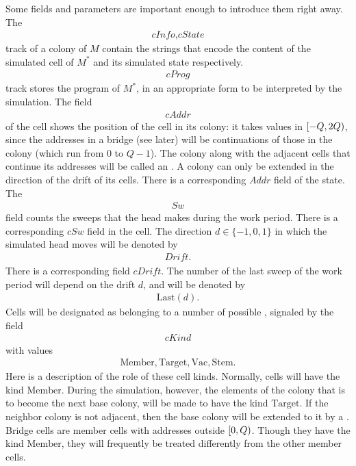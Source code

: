 \documentclass[12pt]{memoir}
\newcommand{\fld}[1]{\ensuremath{\textit{#1}}}
\newcommand{\Addr}{\fld{Addr}}
\newcommand{\cAddr}{\fld{cAddr}}
\newcommand{\Drift}{\fld{Drift}}
\newcommand{\cDrift}{\fld{cDrift}}
\newcommand{\cInfo}{\fld{cInfo}}
\newcommand{\cKind}{\fld{cKind}}
\newcommand{\cProg}{\fld{cProg}}
\newcommand{\cState}{\fld{cState}}
\newcommand{\Sweep}{\fld{Sw}}
\newcommand{\cSweep}{\fld{cSw}}
\newcommand{\Last}{\mathrm{Last}}
\newcommand{\Member}{\mathrm{Member}}
\newcommand{\Target}{\mathrm{Target}}
\newcommand{\Stem}{\mathrm{Stem}}
\newcommand{\Vacant}{\mathrm{Vac}}
\begin{document}
Some fields and parameters are important enough to introduce them right away.
The 
\begin{align*}
   \cInfo,\cState
 \end{align*}
track of a colony of \( M \)
contain the strings that encode the content of the simulated cell of \( M^{*} \) and
its simulated state respectively.
\begin{align*}
 \cProg
 \end{align*}
track stores the program of \( M^{*} \), in an appropriate form 
to be interpreted by the simulation.
The field 
 \begin{align*}
  \cAddr
 \end{align*}
of the cell shows the position of the cell in its colony:
it takes values in \( [-Q,2Q) \), since the addresses in a bridge (see later)
will be continuations of those in the colony (which run from \( 0 \) to \( Q-1 \)).
The colony along with the adjacent cells that continue its addresses will be called
an .
A colony can only be extended in the direction of the drift of its cells.
There is a corresponding \( \Addr \) field of the state.
The
 \begin{align*}
 \Sweep
 \end{align*}
field counts the sweeps that the head makes during the work period.
There is a corresponding \( \cSweep \) field in the cell.
The direction \( d\in\{-1,0,1\} \) in which the 
simulated head moves will be denoted by
 \begin{align*}
   \Drift.
 \end{align*}
There is a corresponding field \( \cDrift \).
The number of the last sweep of the work period will depend on the drift \( d \), 
and will be denoted by 
\begin{align}\label{eq:Last}
   \Last(d).
 \end{align}
Cells will be designated as belonging to a number of possible , signaled by the
field 
\begin{align*}
     \cKind
 \end{align*}
with values
       \begin{align*}
          \Member, \Target, \Vacant, \Stem.
       \end{align*}
Here is a description of the role of these cell kinds.
Normally, cells will have the kind \( \Member \).
During the simulation, however, the elements of the colony that is to become
the next base colony, will be made to have the kind \( \Target \).
If the neighbor colony 
is not adjacent, then the base colony will be extended to it by 
a .
Bridge cells are member cells with addresses outside \( [0,Q) \).
Though they have the kind \( \Member \), they will frequently be treated
differently from the other member cells.
\end{document}
